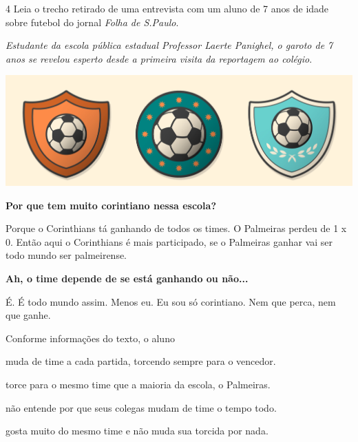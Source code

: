 \num{4} Leia o trecho retirado de uma entrevista com um aluno de 7 anos
de idade sobre futebol do jornal \textit{Folha de S.Paulo}.

\begin{myquote}
\textit{Estudante da escola pública estadual Professor Laerte Panighel, o garoto
de 7 anos se revelou esperto desde a primeira visita da reportagem ao
colégio}.

\begin{center}
\includegraphics[width=\textwidth]{media/image52a.jpeg}
\end{center}

\textbf{Por que tem muito corintiano nessa escola?}

Porque o Corinthians tá ganhando de todos os times. O Palmeiras perdeu
de 1 x 0. Então aqui o Corinthians é mais participado, se o
Palmeiras ganhar vai ser todo mundo ser palmeirense.

\textbf{Ah, o time depende de se está ganhando ou não...}

É. É todo mundo assim. Menos eu. Eu sou só corintiano. Nem que perca,
nem que ganhe.

\end{myquote}

Conforme informações do texto, o aluno

\begin{escolha}
\item muda de time a cada partida, torcendo sempre para o vencedor.

\item torce para o mesmo time que a maioria da escola, o Palmeiras.

\item não entende por que seus colegas mudam de time o tempo todo.

\item gosta muito do mesmo time e não muda sua torcida por nada.
\end{escolha}

